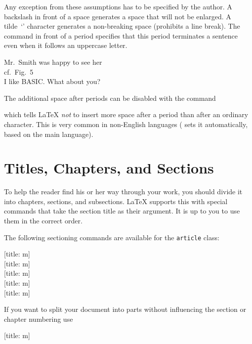 Any exception from these assumptions has to be specified by the author. A
backslash in front of a space generates a space that will not be enlarged. A
tilde~\enquote*{\ai{\~}} character generates a non-breaking space (prohibits a
line break). The command  in front of a period specifies that this
period terminates a sentence even when it follows an uppercase letter.


\begin{example}
Mr.~Smith was happy to see her\\
cf.~Fig.~5\\
I like BASIC\@. What about you?
\end{example}

The additional space after periods can be disabled with the command
\begin{lscommand}
\end{lscommand}
which tells \LaTeX{} \emph{not} to insert more space after a period than after
an ordinary character. This is very common in non-English languages
( sets it automatically, based on the main language).

\section{Titles, Chapters, and Sections}

To help the reader find his or her way through your work, you should
divide it into chapters, sections, and subsections.  \LaTeX{} supports
this with special commands that take the section title as their
argument.  It is up to you to use them in the correct order.

The following sectioning commands are available for the
\texttt{article} class: \nopagebreak

\begin{lscommand}
  [title: m]\\
  [title: m]\\
  [title: m]\\
  [title: m]\\
  [title: m]
\end{lscommand}

If you want to split your document into parts without influencing the
section or chapter numbering use
\begin{lscommand}
  [title: m]
\end{lscommand}

